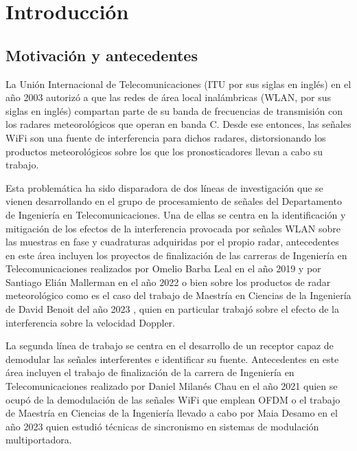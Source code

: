\chapter{Introducción}
\label{Ch:1}
\graphicspath{{figs/}}

\section{Motivación y antecedentes}
\label{S:ch1-antecedentes}

La Unión Internacional de Telecomunicaciones (ITU por sus siglas en inglés) en el año 2003 autorizó a que las redes de área local inalámbricas (WLAN, por sus siglas en inglés) compartan parte de su banda de frecuencias de transmisión con los radares meteorológicos que operan en banda C. Desde ese entonces, las señales WiFi son una fuente de interferencia para dichos radares, distorsionando los productos meteorológicos sobre los que los pronosticadores llevan a cabo su trabajo.

Esta problemática ha sido disparadora de dos líneas de investigación que se vienen desarrollando en el grupo de procesamiento de señales del Departamento de Ingeniería en Telecomunicaciones. Una de ellas se centra en la identificación y mitigación de los
efectos de la interferencia provocada por señales WLAN sobre las muestras en fase y cuadraturas adquiridas por el propio radar, antecedentes en este área incluyen los proyectos de finalización de las carreras de Ingeniería en Telecomunicaciones realizados por Omelio Barba Leal en el año 2019 \cite{tesis-omelio} y por Santiago Elián Mallerman en el año 2022 \cite{tesis-santiago} o bien sobre los productos de radar meteorológico como es el caso del trabajo de Maestría en Ciencias de la Ingeniería de David Benoit del año 2023 \cite{tesis-david}, quien en particular trabajó sobre el efecto de la interferencia sobre la velocidad Doppler.
 
La segunda línea de trabajo se centra en el desarrollo de un receptor capaz de demodular las señales interferentes e identificar su fuente. Antecedentes en este área incluyen el trabajo de finalización de la carrera de Ingeniería en Telecomunicaciones realizado por Daniel Milanés Chau en el año 2021 \cite{tesis-daniel} quien se ocupó de la demodulación de las señales WiFi que emplean OFDM o el trabajo de Maestría en Ciencias de la Ingeniería llevado a cabo por Maia Desamo en el año 2023 \cite{tesis-maia} quien estudió técnicas de sincronismo en sistemas de modulación multiportadora.

